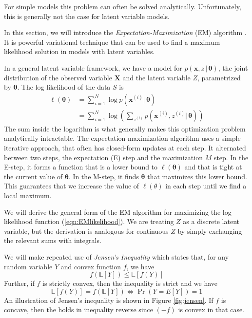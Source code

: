 \documentclass[final,3p,times,twocolumn]{elsarticle}
\let\bs\boldsymbol
\begin{document}
For simple models this problem can often be solved analytically.
Unfortunately, this is generally not the case for latent variable models.

In this section, we will introduce the \emph{Expectation-Maximization} (EM) algorithm \cite{dempster1977}.
It is powerful variational technique that can be used to find a maximum likelihood solution in models with latent variables.

In a general latent variable framework, we have a model for $p(\bs x,z\,|\,\bs\theta)$, the joint distribution of the observed variable $\bs X$ and the latent variable $Z$, parametrized by $\bs\theta$. 
The log likelihood of the data $S$ is 
\begin{equation}
\label{eqn:EMlikelihood}
\begin{split}
\ell(\bs\theta) &= \sum_{i=1}^N \log p(\bs x^{(i)}|\,\bs\theta)\\
&= \sum_{i=1}^N \log \left( \sum_{z^{(i)}} p(\bs x^{(i)},z^{(i)}|\,\bs\theta)\right)
\end{split}
\end{equation}
The sum inside the logarithm is what generally makes this optimization problem analytically intractable.
The expectation-maximization algorithm uses a simple iterative approach, that often has closed-form updates at each step.
It alternated between two steps, the expectation (E) step and the maximization $M$ step.
In the E-step, it forms a function that is a lower bound to $\ell(\bs\theta)$ and that is tight at the current value of $\bs\theta$.
In the M-step, it finds $\bs\theta$ that maximizes this lower bound.
This guarantees that we increase the value of $\ell(\theta)$ in each step until we find a local maximum.

We will derive the general form of the EM algorithm for maximizing the log likelihood function (\ref{eqn:EMlikelihood}).
We are treating $Z$ as a discrete latent variable, but the derivation is analogous for continuous $Z$ by simply exchanging the relevant sums with integrals.

We will make repeated use of \emph{Jensen's Inequality} which states that, for any random variable $Y$ and convex function $f$, we have
\begin{equation*}
f\left(\mathbb{E}[Y]\right) \leq \mathbb{E}\left[f(Y)\right]
\end{equation*}
Further, if $f$ is strictly convex, then the inequality is strict and we have
\begin{equation*}
\mathbb{E}\left[f(Y)\right] = f\left(\mathbb{E}[Y]\right) \iff \Pr\left(Y = E[Y]\right) = 1
\end{equation*}
An illustration of Jensen's inequality is shown in Figure \ref{fig:jensen}.
If $f$ is concave, then the holds in inequality reverse since $(-f)$ is convex in that case. 
\end{document}
